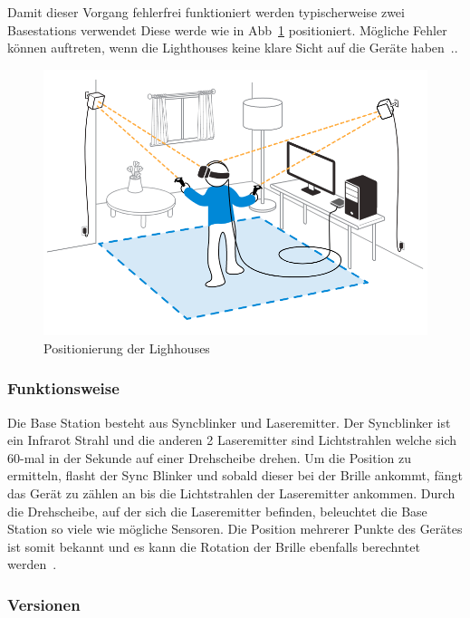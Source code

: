 Damit dieser Vorgang fehlerfrei funktioniert werden typischerweise zwei Basestations verwendet
Diese werde wie in Abb~\ref{fig:basetstation_positioning} positioniert.
Mögliche Fehler können auftreten, wenn die Lighthouses keine klare Sicht auf die Geräte haben~\cite{steam_lighhouse_versions}..

\begin{figure}
    \centering
    \includegraphics[scale=0.4]{pics/basestations_positioning}
    \caption{Positionierung der Lighhouses~\cite{Sercan_2018}}
    \label{fig:basetstation_positioning}
\end{figure}

\subsubsection{Funktionsweise}

Die Base Station besteht aus Syncblinker und Laseremitter.
Der Syncblinker ist ein Infrarot Strahl und die anderen 2 Laseremitter sind Lichtstrahlen welche sich 60-mal in der Sekunde auf einer Drehscheibe drehen.
Um die Position zu ermitteln, flasht der Sync Blinker und sobald dieser bei der Brille ankommt, fängt das Gerät zu zählen an bis die Lichtstrahlen der Laseremitter ankommen.
Durch die Drehscheibe, auf der sich die Laseremitter befinden, beleuchtet die Base Station so viele wie mögliche Sensoren.
Die Position mehrerer Punkte des Gerätes ist somit bekannt und es kann die Rotation der Brille ebenfalls berechntet werden~\cite{Buckley_2015, Skarredghost_2017}.

\subsubsection{Versionen}

